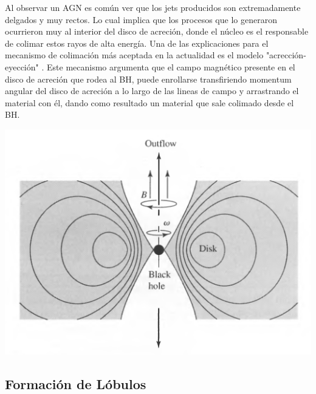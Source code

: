 Al observar un AGN es común ver que los jets producidos son extremadamente delgados y muy rectos. Lo cual implica  que los procesos que lo generaron ocurrieron muy al interior del disco de acreción, donde el núcleo es el responsable de colimar estos rayos de alta energía. Una de las explicaciones para el mecanismo de colimación más aceptada en la actualidad es el modelo "acrección-eyección" \cite{blandford1982}. Este mecanismo argumenta que el campo magnético presente en el disco de acreción que rodea al BH, puede enrollarse transfiriendo momentum angular del disco de acreción a lo largo de las lineas de campo y arrastrando el material con él, dando como resultado un material que sale colimado desde el BH.
%
\begin{center}
\includegraphics[scale=.5]{./figures/3_AGNs/Jets.png}
\label{fig:Modelo_interior_AGN}
\end{center}

	\subsection{Formación de Lóbulos}
	\label{subsec:Formation_lobules}

